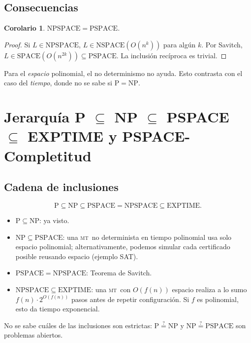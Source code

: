 \documentclass[11pt,a4paper]{article}
\theoremstyle{definicion}
\newtheorem{corolario}[definicion]{Corolario}
\newcommand{\MT}{\textsc{mt}}
\newcommand{\NP}{\mathrm{NP}}
\newcommand{\Pclass}{\mathrm{P}}
\newcommand{\SPACE}{\mathrm{SPACE}}
\newcommand{\NSPACE}{\mathrm{NSPACE}}
\newcommand{\PSPACE}{\mathrm{PSPACE}}
\newcommand{\NPSPACE}{\mathrm{NPSPACE}}
\newcommand{\EXPTIME}{\mathrm{EXPTIME}}
\begin{document}
\subsection{Consecuencias}

\begin{corolario}
$\NPSPACE = \PSPACE$.
\end{corolario}

\begin{proof}
Si $L \in \NPSPACE$, $L \in \NSPACE(O(n^k))$ para alg\'un $k$. Por Savitch, $L \in \SPACE(O(n^{2k})) \subseteq \PSPACE$. La inclusi\'on rec\'iproca es trivial.
\end{proof}

\begin{idea}
Para el \emph{espacio} polinomial, el no determinismo no ayuda. Esto contrasta con el caso del \emph{tiempo}, donde no se sabe si $\Pclass = \NP$.
\end{idea}

\section{Jerarqu\'ia P $\subseteq$ NP $\subseteq$ PSPACE $\subseteq$ EXPTIME y PSPACE-Completitud}

\subsection{Cadena de inclusiones}

\[
\boxed{\;\Pclass \subseteq \NP \subseteq \PSPACE = \NPSPACE \subseteq \EXPTIME.\;}
\]

\begin{itemize}
    \item $\Pclass \subseteq \NP$: ya visto.
    \item $\NP \subseteq \PSPACE$: una \MT\ no determinista en tiempo polinomial usa solo espacio polinomial; alternativamente, podemos simular cada certificado posible reusando espacio (ejemplo SAT).
    \item $\PSPACE = \NPSPACE$: Teorema de Savitch.
    \item $\NPSPACE \subseteq \EXPTIME$: una \MT\ con $O(f(n))$ espacio realiza a lo sumo $f(n) \cdot 2^{O(f(n))}$ pasos antes de repetir configuraci\'on. Si $f$ es polinomial, esto da tiempo exponencial.
\end{itemize}

No se sabe cu\'ales de las inclusiones son estrictas: $\Pclass \overset{?}{=} \NP$ y $\NP \overset{?}{=} \PSPACE$ son problemas abiertos.
\end{document}
